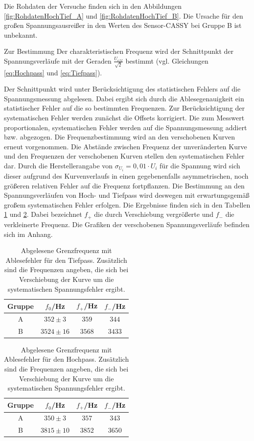 \documentclass[12pt,a4paper]{article}
\begin{document}
Die Rohdaten der Versuche finden sich in den Abbildungen \ref{fig:RohdatenHochTief_A} und \ref{fig:RohdatenHochTief_B}.
Die Ursache für den großen Spannungsausreißer in den Werten des Sensor-CASSY bei Gruppe B ist unbekannt.

Zur Bestimmung Der charakteristischen Frequenz wird der Schnittpunkt der Spannungsverläufe mit der Geraden $\frac{U_{eff}}{\sqrt{2}}$ bestimmt (vgl. Gleichungen \ref{eq:Hochpass} und \ref{eq:Tiefpass}).

Der Schnittpunkt wird unter Berücksichtigung des statistischen Fehlers auf die Spannungsmessung abgelesen. Dabei ergibt sich durch die Ablesegenauigkeit ein statistischer Fehler auf die so bestimmten Frequenzen.
Zur Berücksichtigung der systematischen Fehler werden zunächst die Offsets korrigiert. Die zum Messwert proportionalen, systematischen Fehler werden auf die Spannungsmessung addiert bzw. abgezogen. 
Die Frequenzbestimmung wird an den verschobenen Kurven erneut vorgenommen. Die Abstände zwischen Frequenz der unveränderten Kurve und den Frequenzen der verschobenen Kurven stellen den systematischen Fehler dar. Durch die Herstellerangabe von $\sigma_{U_i} = 0,01 \cdot U_i$ für die Spannung wird sich dieser aufgrund des Kurvenverlaufs in einen gegebenenfalls asymmetrischen, noch größeren relativen Fehler auf die Frequenz fortpflanzen. Die Bestimmung an den Spannungsverläufen von Hoch- und Tiefpass wird deswegen mit erwartungsgemäß großem systematischen Fehler erfolgen. Die Ergebnisse finden sich in den Tabellen \ref{tab:Tiefpass} und \ref{tab:Hochpass}. Dabei bezeichnet $f_+$ die durch Verschiebung vergrößerte und $f_-$ die verkleinerte Frequenz. Die Grafiken der verschobenen Spannungsverläufe befinden sich im Anhang.

\begin{table}
\centering
\begin{tabular}{|c|c|c|c|}
\hline
Gruppe & $f_0$/Hz & $f_{+}$/Hz & $f_{-}$/Hz \\
\hline
A & $352 \pm 3 $ & $359$ & $344$ \\
\hline
B & $3524 \pm 16$ & $3568$ & $3433$ \\
\hline
\end{tabular}
\caption{Abgelesene Grenzfrequenz mit Ablesefehler für den Tiefpass. Zusätzlich sind die Frequenzen angeben, die sich bei Verschiebung der Kurve um die systematischen Spannungsfehler ergibt.}
\label{tab:Tiefpass}
\end{table}


\begin{table}
\centering
\begin{tabular}{|c|c|c|c|}
\hline
Gruppe & $f_0$/Hz & $f_{+}$/Hz & $f_{-}$/Hz \\
\hline
A & $350 \pm 3 $ & $357$ & $343$ \\
\hline
B & $3815 \pm 10 $ & $3852$ & $3650$ \\
\hline
\end{tabular}
\caption{Abgelesene Grenzfrequenz mit Ablesefehler für den Hochpass. Zusätzlich sind die Frequenzen angeben, die sich bei Verschiebung der Kurve um die systematischen Spannungsfehler ergibt.}
\label{tab:Hochpass}
\end{table}
\end{document}
